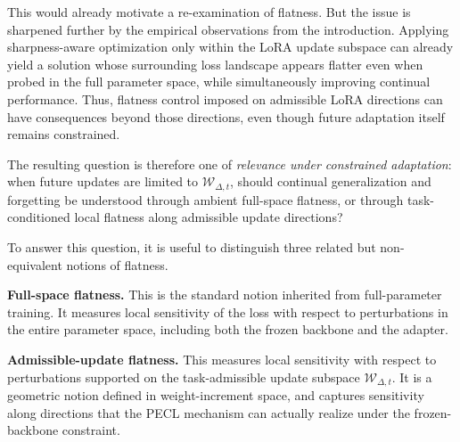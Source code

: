 \documentclass[10pt]{article} %
\begin{document}
This would already motivate a re-examination of flatness.
But the issue is sharpened further by the empirical observations from the introduction.
Applying sharpness-aware optimization only within the LoRA update subspace can already yield a solution whose surrounding loss landscape appears flatter even when probed in the full parameter space, while simultaneously improving continual performance.
Thus, flatness control imposed on admissible LoRA directions can have consequences beyond those directions, even though future adaptation itself remains constrained.

The resulting question is therefore one of \emph{relevance under constrained adaptation}: when future updates are limited to $\mathcal{W}_{\Delta,t}$, should continual generalization and forgetting be understood through ambient full-space flatness, or through task-conditioned local flatness along admissible update directions?


To answer this question, it is useful to distinguish three related but non-equivalent notions of flatness.

\textbf{Full-space flatness.}
This is the standard notion inherited from full-parameter training.
It measures local sensitivity of the loss with respect to perturbations in the entire parameter space, including both the frozen backbone and the adapter.


\textbf{Admissible-update flatness.}
This measures local sensitivity with respect to perturbations supported on the task-admissible update subspace $\mathcal{W}_{\Delta,t}$.
It is a geometric notion defined in weight-increment space, and captures sensitivity along directions that the PECL mechanism can actually realize under the frozen-backbone constraint.
\end{document}

